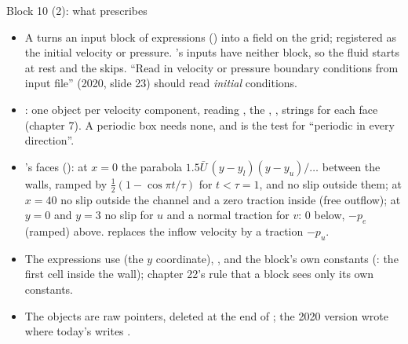 \documentclass[aspectratio=169,11pt]{beamer}
\begin{document}
\begin{frame}{Block 10 (2): what  prescribes}
\label{fr:icbc2}
\footnotesize
\begin{itemize}
  \item A  turns an input block of expressions () into a field on the grid; registered as the initial velocity or pressure. 's inputs have neither block, so the fluid starts at rest and the  skips. ``Read in velocity or pressure boundary conditions from input file'' (2020, slide 23) should read \emph{initial} conditions.
  \item {}: one object per velocity component, reading , the , ,  strings for each face (chapter 7). A periodic box needs none, and  is the test for ``periodic in every direction''.
  \item {}'s faces (): at $x = 0$ the parabola $1.5\bar U\,(y - y_l)(y - y_u)/\ldots$ between the walls, ramped by $\tfrac12(1 - \cos\pi t/\tau)$ for $t < \tau = 1$, and no slip outside them; at $x = 40$ no slip outside the channel and a zero traction inside (free outflow); at $y = 0$ and $y = 3$ no slip for $u$ and a normal traction for $v$: $0$ below, $-p_e$ (ramped) above.  replaces the inflow velocity by a traction $-p_u$.
  \item The expressions use  (the $y$ coordinate), , and the block's own constants (: the first cell inside the wall); chapter 22's rule that a block sees only its own constants.
  \item The objects are raw pointers, deleted at the end of ; the 2020 version wrote  where today's writes .
\end{itemize}
\end{frame}
\end{document}
